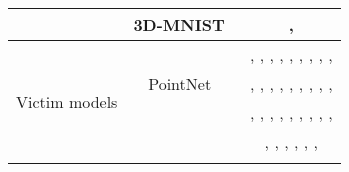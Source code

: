 \documentclass{ieeeaccess}
\begin{document}
\begin{table*}
\begin{center}
\begin{tabular}{ c|c|c}
& \multirow{1}{*}{3D-MNIST~\cite{3Dminst}} & \cite{zheng2019pointcloud}, \cite{Shi2022Shape}\\
\hline


\multirow{18}{*}{Victim models}


& \multirow{3}{*}{PointNet~\cite{qi2017pointnet}} & \cite{liu2019extending}, \cite{wicker2019robustness}, \cite{yang2019adversarial}, \cite{liu2022imperceptible}, \cite{kim2021minimal}, \cite{liu2020adversarial}, \cite{arya2021adversarial}, \cite{zhou2020lg}, \cite{wen2020geometry}, \cite{hamdi2020advpc}\\
&& \cite{zheng2019pointcloud}, \cite{xiang2019generating}, \cite{wu2020if}, \cite{liang2022pagn}, \cite{liu2022boosting}, \cite{denipitiyage2021provable}, \cite{liu2021pointguard}, \cite{sun2020adversarial}, \cite{sun2021local}, \cite{sun2021improving}\\ && \cite{dai2021generating}, \cite{zhang20233d}, \cite{lee2020shapeadv}, \cite{dong2020self}, \cite{zhao2020nudge}, \cite{zhao2020isometry}, \cite{lang2021geometric}, \cite{zhang2019defense}, \cite{ma2020efficient}, \cite{zhou2019dup}\\ && \cite{cheng2021universal}, \cite{ma2021towards}, \cite{li2022robust}, \cite{miao2022isometric}, \cite{liu2022point}, \cite{Shi2022Shape}, \cite{he2023point}\\
\cline{2-3}


\end{tabular}
\end{center}
\end{table*}
\end{document}
